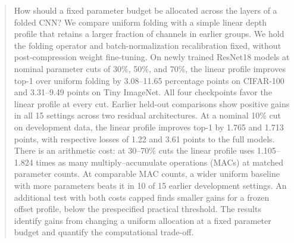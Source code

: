 \begin{abstract}
How should a fixed parameter budget be allocated across the layers of a
folded CNN? We compare uniform folding with a simple linear depth profile
that retains a larger fraction of channels in earlier groups. We hold
the folding operator and batch-normalization recalibration fixed, without
post-compression weight fine-tuning. On newly trained ResNet18 models
at nominal parameter cuts of 30\%, 50\%, and 70\%, the linear profile
improves top-1 over uniform folding by 3.08--11.65 percentage points on
CIFAR-100 and 3.31--9.49 points on Tiny ImageNet. All four checkpoints
favor the linear profile at every cut. Earlier held-out comparisons show
positive gains in all 15 settings across two residual architectures.
At a nominal 10\% cut on development data, the linear profile improves
top-1 by 1.765 and 1.713 points, with respective losses of 1.22 and 3.61
points to the full models. There is an arithmetic cost: at 30--70\% cuts
the linear profile uses
1.105--1.824 times as many multiply--accumulate operations (MACs) at
matched parameter counts. At comparable MAC counts, a wider uniform
baseline with more parameters beats it in 10 of 15 earlier development
settings. An additional test with both costs capped finds smaller gains
for a frozen offset profile, below the prespecified practical threshold.
The results identify gains from changing a uniform allocation at a fixed
parameter budget and quantify the computational trade-off.
\end{abstract}
